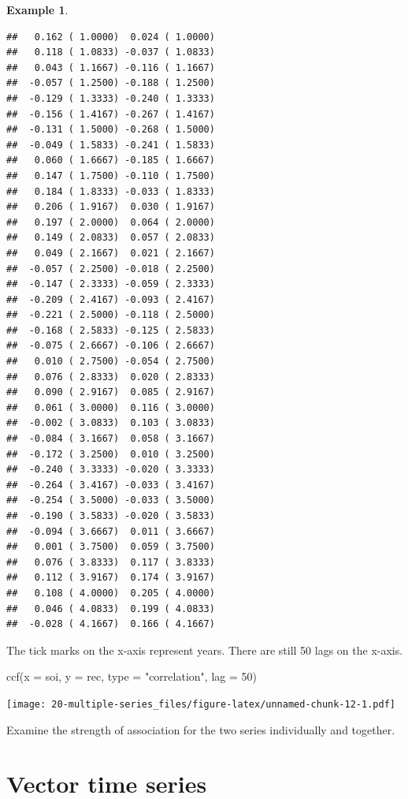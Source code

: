 \documentclass[
]{book}
\newenvironment{Shaded}{\begin{snugshade}}{\end{snugshade}}
\newcommand{\AttributeTok}[1]{\textcolor[rgb]{0.77,0.63,0.00}{#1}}
\newcommand{\DecValTok}[1]{\textcolor[rgb]{0.00,0.00,0.81}{#1}}
\newcommand{\FunctionTok}[1]{\textcolor[rgb]{0.00,0.00,0.00}{#1}}
\newcommand{\NormalTok}[1]{#1}
\newcommand{\StringTok}[1]{\textcolor[rgb]{0.31,0.60,0.02}{#1}}
\theoremstyle{definition}
\theoremstyle{definition}
\newtheorem{example}{Example}[chapter]
\theoremstyle{definition}
\theoremstyle{definition}
\theoremstyle{remark}
\begin{document}
\begin{example}
\begin{verbatim}
##   0.162 ( 1.0000)  0.024 ( 1.0000)
##   0.118 ( 1.0833) -0.037 ( 1.0833)
##   0.043 ( 1.1667) -0.116 ( 1.1667)
##  -0.057 ( 1.2500) -0.188 ( 1.2500)
##  -0.129 ( 1.3333) -0.240 ( 1.3333)
##  -0.156 ( 1.4167) -0.267 ( 1.4167)
##  -0.131 ( 1.5000) -0.268 ( 1.5000)
##  -0.049 ( 1.5833) -0.241 ( 1.5833)
##   0.060 ( 1.6667) -0.185 ( 1.6667)
##   0.147 ( 1.7500) -0.110 ( 1.7500)
##   0.184 ( 1.8333) -0.033 ( 1.8333)
##   0.206 ( 1.9167)  0.030 ( 1.9167)
##   0.197 ( 2.0000)  0.064 ( 2.0000)
##   0.149 ( 2.0833)  0.057 ( 2.0833)
##   0.049 ( 2.1667)  0.021 ( 2.1667)
##  -0.057 ( 2.2500) -0.018 ( 2.2500)
##  -0.147 ( 2.3333) -0.059 ( 2.3333)
##  -0.209 ( 2.4167) -0.093 ( 2.4167)
##  -0.221 ( 2.5000) -0.118 ( 2.5000)
##  -0.168 ( 2.5833) -0.125 ( 2.5833)
##  -0.075 ( 2.6667) -0.106 ( 2.6667)
##   0.010 ( 2.7500) -0.054 ( 2.7500)
##   0.076 ( 2.8333)  0.020 ( 2.8333)
##   0.090 ( 2.9167)  0.085 ( 2.9167)
##   0.061 ( 3.0000)  0.116 ( 3.0000)
##  -0.002 ( 3.0833)  0.103 ( 3.0833)
##  -0.084 ( 3.1667)  0.058 ( 3.1667)
##  -0.172 ( 3.2500)  0.010 ( 3.2500)
##  -0.240 ( 3.3333) -0.020 ( 3.3333)
##  -0.264 ( 3.4167) -0.033 ( 3.4167)
##  -0.254 ( 3.5000) -0.033 ( 3.5000)
##  -0.190 ( 3.5833) -0.020 ( 3.5833)
##  -0.094 ( 3.6667)  0.011 ( 3.6667)
##   0.001 ( 3.7500)  0.059 ( 3.7500)
##   0.076 ( 3.8333)  0.117 ( 3.8333)
##   0.112 ( 3.9167)  0.174 ( 3.9167)
##   0.108 ( 4.0000)  0.205 ( 4.0000)
##   0.046 ( 4.0833)  0.199 ( 4.0833)
##  -0.028 ( 4.1667)  0.166 ( 4.1667)
\end{verbatim}

The tick marks on the x-axis represent years. There are still 50 lags on the x-axis.

\begin{Shaded}
\begin{Highlighting}[]
\FunctionTok{ccf}\NormalTok{(}\AttributeTok{x =}\NormalTok{ soi, }\AttributeTok{y =}\NormalTok{ rec, }\AttributeTok{type =} \StringTok{"correlation"}\NormalTok{, }\AttributeTok{lag =} \DecValTok{50}\NormalTok{)}
\end{Highlighting}
\end{Shaded}

\texttt{[image: 20-multiple-series\_files/figure-latex/unnamed-chunk-12-1.pdf]}

Examine the strength of association for the two series individually and together.
\end{example}

\hypertarget{vector-time-series}{%
\section{Vector time series}\label{vector-time-series}}
\end{document}
